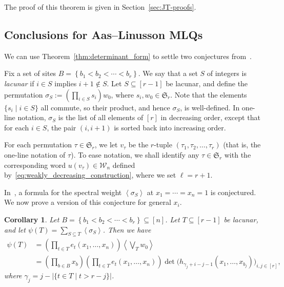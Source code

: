 \documentclass[reqno]{amsart}
\newcommand{\0}{\phantom{c}}
\newcommand{\swt}[1]{\left\langle #1 \right\rangle} %
\newcommand{\SymGp}[1]{\mathfrak{S}_{#1}} %
\newcommand{\mcW}{\mathcal{W}}
\let\sumnonlimits\sum
\let\prodnonlimits\prod
\renewcommand{\sum}{\sumnonlimits\limits}
\renewcommand{\prod}{\prodnonlimits\limits}
\newcommand{\set}[1]{\left\{ #1 \right\}}
\newcommand{\abs}[1]{\left| #1 \right|}
\newcommand{\tup}[1]{\left( #1 \right)}
\newcommand{\ive}[1]{\left[ #1 \right]}
\newcommand{\defn}[1]{{\color{darkred}\emph{#1}}} %
\theoremstyle{plain}
\newtheorem{cor}[thm]{Corollary}
\theoremstyle{definition}
\numberwithin{equation}{section}
\begin{document}
The proof of this theorem is given in Section~\ref{sec:JT-proofs}.




\subsection{Conclusions for Aas--Linusson MLQs}

We can use Theorem~\ref{thm:determinant_form} to settle two conjectures from~\cite{AasLin17}.

Fix a set of sites $B = \set{b_1 < b_2 < \cdots < b_r}$.
We say that a set $S$ of integers is \defn{lacunar} if $i\in S$ implies $i+1 \notin S$.
Let $S \subseteq \ive{r-1}$ be lacunar, and define the permutation $\sigma_S := \left( \prod_{i \in S} s_i \right) w_0$, where $s_i, w_0 \in \SymGp{r}$.
Note that the elements $\{s_i \mid i \in S\}$ all commute, so their product, and hence $\sigma_S$, is well-defined.
In one-line notation, $\sigma_S$ is the list of all elements of $\ive{r}$ in decreasing order, except that for each $i \in S$, the pair $\tup{i, i+1}$ is sorted back into increasing order.

For each permutation $\tau \in \SymGp{r}$, we let $v_\tau$ be the $r$-tuple $\tup{\tau_1, \tau_2, \ldots, \tau_r}$ (that is, the one-line notation of $\tau$).
To ease notation, we shall identify any $\tau \in \SymGp{r}$ with the corresponding word $u(v_{\tau}) \in \mcW_n$ defined by~\eqref{eq:weakly_decreasing_construction}, where we set $\ell=r+1$.

In~\cite[Conj.~3.10]{AasLin17}, a formula for the spectral weight $\swt{\sigma_S}$ at $x_1 = \cdots = x_n = 1$ is conjectured.
We now prove a version of this conjecture for general $x_i$.

\begin{cor}
\label{cor:special_weight_lacunar}
Let $B = \set{b_1 < b_2 < \cdots < b_r} \subseteq \ive{n}$.
Let $T \subseteq \ive{r-1}$ be lacunar, and let $\psi(T) = \sum_{S \subseteq T} \swt{\sigma_S}$.
Then we have
\begin{align*}
  \psi(T) & = \left(\prod_{t \in T} e_t(x_1, \dotsc, x_n) \right) \swt{ \bigvee_T w_0}
  \\ & = \left( \prod_{b \in B} x_b \right) \left(\prod_{t \in T} e_t(x_1, \dotsc, x_n) \right) \det\bigl(h_{\gamma_j+i-j-1}(x_1, \dotsc, x_{b_j})\bigr)_{i, j \in \ive{r}},
\end{align*}
where $\gamma_j = j - \abs{ \{t \in T \mid t > r - j \} }$.
\end{cor}
\end{document}
